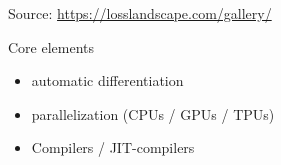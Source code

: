 \documentclass[
    xcolor={svgnames,dvipsnames},
    hyperref={colorlinks, citecolor=DeepPink4, linkcolor=DarkRed, urlcolor=DarkBlue}
    ]{beamer}  %
\newcommand{\1}{\mathbbm 1}
\begin{document}
\begin{frame}
    
    \begin{figure}
       \begin{center}
       \end{center}
    \end{figure}

    Source: \url{https://losslandscape.com/gallery/}

\end{frame}

\begin{frame}
    

    Core elements
    \begin{itemize}
        \item automatic differentiation
        \vspace{0.5em}
        \item parallelization (CPUs / GPUs / TPUs)
        \vspace{0.5em}
        \item Compilers / JIT-compilers
    \end{itemize}

\end{frame}
\end{document}
